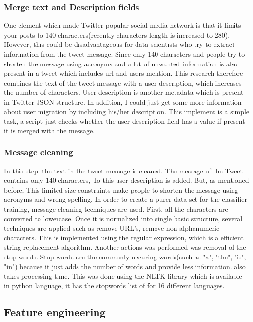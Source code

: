 \subsubsection{Merge text and Description fields}

One element which made Twitter popular social media network is that it limits your posts to 140 characters(recently characters length is increased to 280). However, this could be disadvantageous for data scientists who try to extract information from the tweet message. Since only 140 characters and people try to shorten the message using acronyms and a lot of unwanted information is also present in a tweet which includes url and users mention. This research therefore combines the text of the tweet message with a user description, which increases the number of characters. User description is another metadata which is present in Twitter JSON structure. In addition, I could just get some more information about user migration by including his/her description. This implement is a simple task, a script just checks whether the user description field has a value if present it is merged with the message.

\subsubsection{Message cleaning}
In this step, the text in the tweet message is cleaned. The message of the Tweet contains only 140 characters, To this user description is added. But, as mentioned before, This limited size constraints make people to shorten the message using acronyms and wrong spelling. 
In order to create a purer data set for the classifier training, message cleaning techniques are used. First, all the characters are converted to lowercase. Once it is normalized into single basic structure, several techniques are applied such as remove URL's, remove non-alphanumeric characters. This is implemented using the regular expression, which is a efficient string replacement algorithm. Another actions was performed was removal of the stop words. Stop words are the commonly occuring words(such as "a", "the", "is", "in") because it just adds the number of words and provide less information. also takes processing time. This was done using the NLTK library which is available in python language, it has the stopwords list of for 16 different languages.  

\subsection{Feature engineering}


